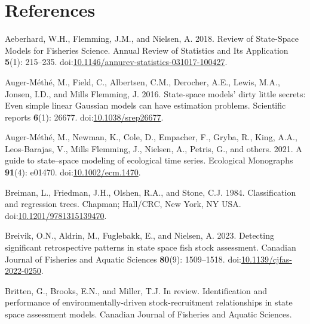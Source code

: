 \documentclass[
  12pt,
]{article}
\newlength{\cslhangindent}
\newenvironment{CSLReferences}[2] %
 {\begin{list}{}{%
  \setlength{\itemindent}{0pt} %
  \setlength{\leftmargin}{0pt} %
  \setlength{\parsep}{0pt} %
  \ifodd #1
   \setlength{\leftmargin}{\cslhangindent} %
   \setlength{\itemindent}{-1\cslhangindent} %
  \fi
  \setlength{\itemsep}{#2\baselineskip}}} %
 {\end{list}} %
\begin{document}
\pagebreak

\section*{References}\label{references}

\protect{}\label{refs}
\begin{CSLReferences}{1}{0}
Aeberhard, W.H., Flemming, J.M., and Nielsen, A. 2018. Review of
{State}-{Space Models} for {Fisheries Science}. Annual Review of
Statistics and Its Application \textbf{5}(1): 215--235.
doi:\href{https://doi.org/10.1146/annurev-statistics-031017-100427}{10.1146/annurev-statistics-031017-100427}.

Auger-Méthé, M., Field, C., Albertsen, C.M., Derocher, A.E., Lewis,
M.A., Jonsen, I.D., and Mills Flemming, J. 2016. State-space models'
dirty little secrets: Even simple linear {G}aussian models can have
estimation problems. Scientific reports \textbf{6}(1): 26677.
doi:\href{https://doi.org/10.1038/srep26677}{10.1038/srep26677}.

{Auger-Méthé, M., Newman, K., Cole, D., Empacher, F., Gryba, R., King,
A.A., Leos-Barajas, V., Mills Flemming, J., Nielsen, A., Petris, G., and
others}. 2021. A guide to state--space modeling of ecological time
series. Ecological Monographs \textbf{91}(4): e01470.
doi:\href{https://doi.org/10.1002/ecm.1470}{10.1002/ecm.1470}.

Breiman, L., Friedman, J.H., Olshen, R.A., and Stone, C.J. 1984.
Classification and regression trees. Chapman; Hall/CRC, New York, NY
USA.
doi:\href{https://doi.org/10.1201/9781315139470}{10.1201/9781315139470}.

Breivik, O.N., Aldrin, M., Fuglebakk, E., and Nielsen, A. 2023.
Detecting significant retrospective patterns in state space fish stock
assessment. Canadian Journal of Fisheries and Aquatic Sciences
\textbf{80}(9): 1509--1518.
doi:\href{https://doi.org/10.1139/cjfas-2022-0250}{10.1139/cjfas-2022-0250}.

Britten, G., Brooks, E.N., and Miller, T.J. In review. Identification
and performance of environmentally-driven stock-recruitment
relationships in state space assessment models. Canadian Journal of
Fisheries and Aquatic Sciences.


\end{CSLReferences}
\end{document}
